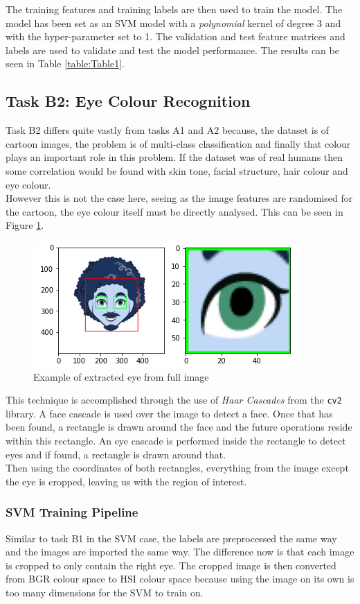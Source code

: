 \documentclass{article}
\begin{document}
    The training features and training labels are then used to train the model. The model has been set as an SVM model with a \textit{polynomial} kernel of degree 3 and with the hyper-parameter set to 1. The validation and test feature matrices and labels are used to validate and test the model performance. The results can be seen in Table \ref{table:Table1}.
    \subsection{Task B2: Eye Colour Recognition}
    Task B2 differs quite vastly from tasks A1 and A2 because, the dataset is of cartoon images, the problem is of multi-class classification and finally that colour plays an important role in this problem. If the dataset was of real humans then some correlation would be found with skin tone, facial structure, hair colour and eye colour. \\
    
    However this is not the case here, seeing as the image features are randomised for the cartoon, the eye colour itself must be directly analysed. This can be seen in Figure \ref{fig:eye}.
    \begin{figure}[htb]
	\centering
	\includegraphics[scale=0.7]{Figures/Eye.PNG}
	\caption{Example of extracted eye from full image}
	\label{fig:eye}
\end{figure}     
	This technique is accomplished through the use of \textit{Haar Cascades} from the \verb|cv2| library. A face cascade is used over the image to detect a face. Once that has been found, a rectangle is drawn around the face and the future operations reside within this rectangle. An eye cascade is performed inside the rectangle to detect eyes and if found, a rectangle is drawn around that.\\
	
	Then using the coordinates of both rectangles, everything from the image except the eye is cropped, leaving us with the region of interest.  
	\subsubsection{SVM Training Pipeline}
	Similar to task B1 in the SVM case, the labels are preprocessed the same way and the images are imported the same way. The difference now is that each image is cropped to only contain the right eye. The cropped image is then converted from BGR colour space to HSI colour space because using the image on its own is too many dimensions for the SVM to train on.\\
	
\end{document}
